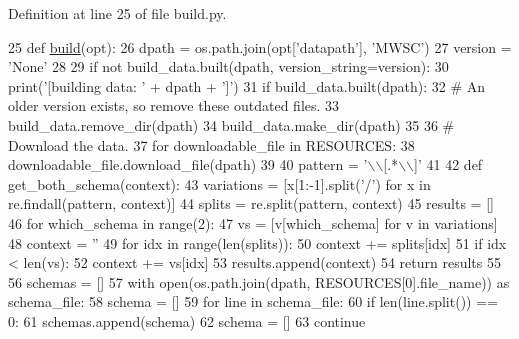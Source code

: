 Definition at line 25 of file build.\+py.


\begin{DoxyCode}
25 \textcolor{keyword}{def }\hyperlink{namespacedialog__babi__feedback_1_1build_a7a9d289f7493a5ded13c4b7f071b6184}{build}(opt):
26     dpath = os.path.join(opt[\textcolor{stringliteral}{'datapath'}], \textcolor{stringliteral}{'MWSC'})
27     version = \textcolor{stringliteral}{'None'}
28 
29     \textcolor{keywordflow}{if} \textcolor{keywordflow}{not} build\_data.built(dpath, version\_string=version):
30         print(\textcolor{stringliteral}{'[building data: '} + dpath + \textcolor{stringliteral}{']'})
31         \textcolor{keywordflow}{if} build\_data.built(dpath):
32             \textcolor{comment}{# An older version exists, so remove these outdated files.}
33             build\_data.remove\_dir(dpath)
34         build\_data.make\_dir(dpath)
35 
36         \textcolor{comment}{# Download the data.}
37         \textcolor{keywordflow}{for} downloadable\_file \textcolor{keywordflow}{in} RESOURCES:
38             downloadable\_file.download\_file(dpath)
39 
40         pattern = \textcolor{stringliteral}{'\(\backslash\)\(\backslash\)[.*\(\backslash\)\(\backslash\)]'}
41 
42         \textcolor{keyword}{def }get\_both\_schema(context):
43             variations = [x[1:-1].split(\textcolor{stringliteral}{'/'}) \textcolor{keywordflow}{for} x \textcolor{keywordflow}{in} re.findall(pattern, context)]
44             splits = re.split(pattern, context)
45             results = []
46             \textcolor{keywordflow}{for} which\_schema \textcolor{keywordflow}{in} range(2):
47                 vs = [v[which\_schema] \textcolor{keywordflow}{for} v \textcolor{keywordflow}{in} variations]
48                 context = \textcolor{stringliteral}{''}
49                 \textcolor{keywordflow}{for} idx \textcolor{keywordflow}{in} range(len(splits)):
50                     context += splits[idx]
51                     \textcolor{keywordflow}{if} idx < len(vs):
52                         context += vs[idx]
53                 results.append(context)
54             \textcolor{keywordflow}{return} results
55 
56         schemas = []
57         with open(os.path.join(dpath, RESOURCES[0].file\_name)) \textcolor{keyword}{as} schema\_file:
58             schema = []
59             \textcolor{keywordflow}{for} line \textcolor{keywordflow}{in} schema\_file:
60                 \textcolor{keywordflow}{if} len(line.split()) == 0:
61                     schemas.append(schema)
62                     schema = []
63                     \textcolor{keywordflow}{continue}

\end{DoxyCode}
